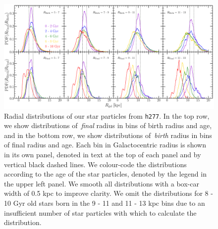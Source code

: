 \documentclass[fleqn, usenatbib]{mnras}
\begin{document}
\begin{figure} 
\centering 
\includegraphics[scale = 0.32]{decomposition.pdf} 
\caption{Radial distributions of our star particles from 
\texttt{h277}. In the top row, we show distributions of~\textit{final} radius 
in bins of birth radius and age, and in the bottom row, we show distributions 
of~\textit{birth} radius in bins of final radius and age. Each bin in 
Galactocentric radius is shown in its own panel, denoted in text at the top of 
each panel and by vertical black dashed lines. We colour-code the distributions 
according to the age of the star particles, denoted by the legend in the upper 
left panel. We smooth all distributions with a box-car width of 0.5 kpc to 
improve clarity. We omit the distributions for 8 - 10 Gyr old stars born in the 
9 - 11 and 11 - 13 kpc bins due to an insufficient number of star particles 
with which to calculate the distribution. } 
\label{fig:h277_decomposition} 
\end{figure} 
\end{document}
